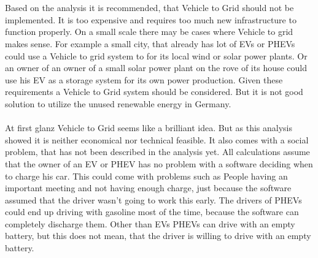 \documentclass[12pt,a4paper]{article}
\begin{document}
\begin{parcolumns}[colwidths={1=2.5 cm, 2=10 cm, 3=2.5cm}]{3}
{\\ \\
\noindent
Based on the analysis it is recommended, that Vehicle to Grid should not be implemented. It is too expensive and requires too much new infrastructure to function properly. On a small scale there may be cases where Vehicle to grid makes sense. For example a small city, that already has lot of EVs or PHEVs could use a Vehicle to grid system to for its local wind or solar power plants. Or an owner of an owner of a small solar power plant on the rove of its house could use his EV as a storage system for its own power production. Given these requirements a Vehicle to Grid system should be considered. But it is not good solution to utilize the unused renewable energy in Germany.
\\ \\
\noindent
At first glanz Vehicle to Grid seems like a brilliant idea. But as this analysis showed it is neither economical nor technical feasible. It also comes with a social problem, that has not been described in the analysis yet. All calculations assume that the owner of an EV or PHEV has no problem with a software deciding when to charge his car. This could come with problems such as People having an important meeting and not having enough charge, just because the software assumed that the driver wasn't going to work this early. The drivers of PHEVs could end up driving with gasoline most of the time, because the software can completely discharge them. Other than EVs PHEVs can drive with an empty battery, but this does not mean, that the driver is willing to drive with an empty battery.
}


\end{parcolumns}
\end{document}
